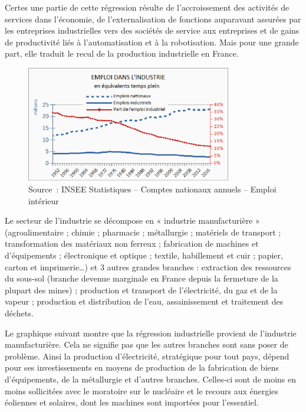 \documentclass[a4paper]{article}
\begin{document}
Certes une partie de cette régression résulte de l’accroissement des activités de services dans l’économie, de l’externalisation de fonctions auparavant assurées par les entreprises industrielles vers des sociétés de service aux entreprises et de gains de productivité liés à l’automatisation et à la robotisation. Mais pour une grande part, elle traduit le recul de la production industrielle en France.

\begin{figure}[H]
\centering
\includegraphics*[width=0.8\textwidth]{images/emploi}
\caption{Source~: INSEE Statistiques – Comptes nationaux annuels – Emploi intérieur}
\label{fig:emploi}
\end{figure}

Le secteur de l’industrie se décompose en « industrie manufacturière » (agroalimentaire ; chimie ; pharmacie ; métallurgie ; matériels de transport ; transformation des matériaux non ferreux ; fabrication de machines et d’équipements ; électronique et optique ; textile, habillement et cuir ; papier, carton et imprimerie…) et 3 autres grandes branches : extraction des ressources du sous-sol (branche devenue marginale en France depuis la fermeture de la plupart des mines) ; production et transport de l’électricité, du gaz et de la vapeur ;  production et distribution de l’eau, assainissement et  traitement des déchets.

Le graphique suivant montre que la régression industrielle provient de l’industrie manufacturière. Cela ne signifie pas que les autres branches sont sans poser de problème. Ainsi la production d’électricité, stratégique pour tout pays, dépend pour ses investissements en moyens de production de la fabrication de biens d’équipements, de la métallurgie et d’autres branches. Celles-ci sont de moins en moins sollicitées avec le moratoire sur le nucléaire et le recours aux énergies éoliennes et solaires, dont les machines sont importées pour l’essentiel.
\end{document}
